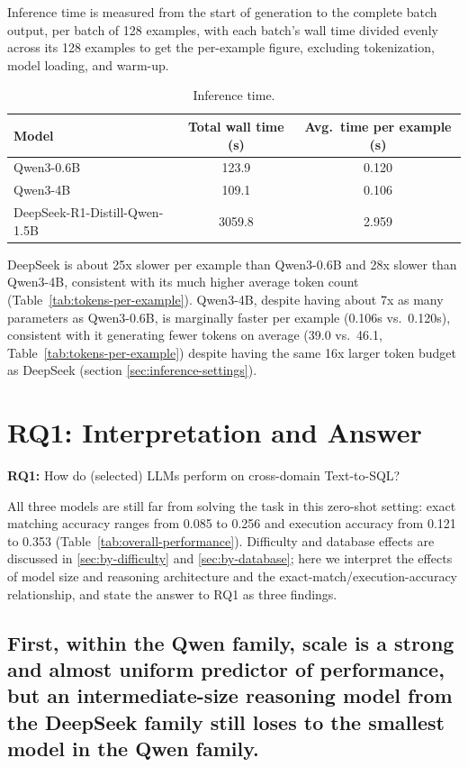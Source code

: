 Inference time is measured from the start of generation to the complete batch output, per batch of 128 examples, with each batch's wall time divided evenly across its 128 examples to get the per-example figure, excluding tokenization, model loading, and warm-up.

\begin{table}[H]
\centering
\footnotesize
\caption{Inference time.}
\label{tab:inference-time}
\begin{tabular}{lcc}
\toprule
Model & Total wall time (s) & Avg.\ time per example (s) \\
\midrule
Qwen3-0.6B & 123.9 & 0.120 \\
Qwen3-4B & 109.1 & 0.106 \\
DeepSeek-R1-Distill-Qwen-1.5B & 3059.8 & 2.959 \\
\bottomrule
\end{tabular}
\end{table}

DeepSeek is about 25x slower per example than Qwen3-0.6B and 28x slower than Qwen3-4B, consistent with its much higher average token count (Table~\ref{tab:tokens-per-example}). Qwen3-4B, despite having about 7x as many parameters as Qwen3-0.6B, is marginally faster per example (0.106s vs.\ 0.120s), consistent with it generating fewer tokens on average (39.0 vs.\ 46.1, Table~\ref{tab:tokens-per-example}) despite having the same 16x larger token budget as DeepSeek (section \ref{sec:inference-settings}).


\section{RQ1: Interpretation and Answer}
\label{sec:rq1-interpretation}

\textbf{RQ1:} How do (selected) LLMs perform on cross-domain Text-to-SQL?

\vspace{10px}

All three models are still far from solving the task in this zero-shot setting: exact matching accuracy ranges from 0.085 to 0.256 and execution accuracy from 0.121 to 0.353 (Table~\ref{tab:overall-performance}). Difficulty and database effects are discussed in \ref{sec:by-difficulty} and \ref{sec:by-database}; here we interpret the effects of model size and reasoning architecture and the exact-match/execution-accuracy relationship, and state the answer to RQ1 as three findings.

\subsection{First, within the Qwen family, scale is a strong and almost uniform predictor of performance, but an intermediate-size reasoning model from the DeepSeek family still loses to the smallest model in the Qwen family.}
\label{sec:rq1-finding-scale}

